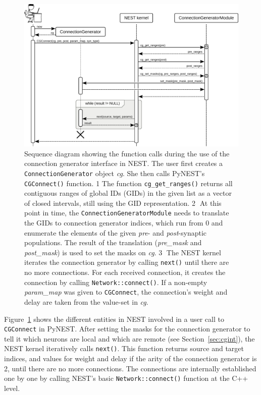 \documentclass{frontiersSCNS} %
\newcommand{\INLINEFIGS}{} %
\newcommand{\Figure}[2]{Figure~\ref{#2}}
\newcommand{\Figure}[2]{Figure~#1}
\begin{document}
\ifdefined\INLINEFIGS
\begin{figure}[ht]
\centering
\includegraphics[scale=.8]{figures/sequence_diagram_nest.pdf}
\caption{Sequence diagram showing the function calls during the use of
  the connection generator interface in NEST. The user first creates a
  \texttt{ConnectionGenerator} object \emph{cg}. She then calls
  PyNEST's \texttt{CGConnect()} function. \textcircled{\footnotesize
    1} The function \texttt{cg\_get\_ranges()} returns all contiguous
  ranges of global IDs (GIDs) in the given list as a vector of closed
  intervals, still using the GID representation.
  \textcircled{\footnotesize 2} At this point in time, the
  \texttt{ConnectionGeneratorModule} needs to translate the GIDs to
  connection generator indices, which run from 0 and enumerate the
  elements of the
  given \emph{pre}- and \emph{post}-synaptic populations. The result
  of the translation (\emph{pre\_mask} and \emph{post\_mask}) is used
  to set the masks on \emph{cg}. \textcircled{\footnotesize 3} The
  NEST kernel iterates the connection generator by calling
  \texttt{next()} until there are no more connections. For each
  received connection, it creates the connection by calling
  \texttt{Network::connect()}. If a non-empty \emph{param\_map} was
  given to \texttt{CGConnect}, the connection's weight and delay are
  taken from the value-set in
  \emph{cg}.}\label{fig:sequence_diagram_nest}
\end{figure}
\fi

\Figure{3}{fig:sequence_diagram_nest} shows the different entities in
NEST involved in a user call to \verb|CGConnect| in PyNEST. After
setting the masks for the connection generator to tell it which
neurons are local and which are remote (see Section~\ref{sec:cgint}),
the NEST kernel iteratively calls \verb|next()|. This function returns
source and target indices, and values for weight and delay if the
arity of the connection generator is 2, until there are no more
connections. The connections are internally established one by one by
calling NEST's basic \verb|Network::connect()| function at the C++
level.
\end{document}
